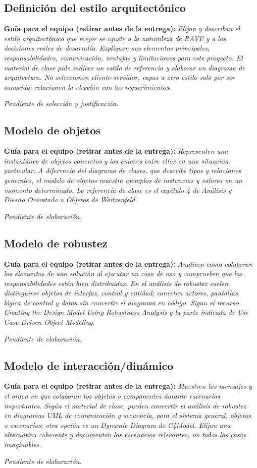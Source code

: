 \documentclass[12pt,letterpaper]{article}
\newcommand{\guia}[1]{\par\smallskip\noindent\textbf{Guía para el equipo (retirar antes de la entrega):} \textit{#1}\par\smallskip}
\begin{document}
\subsection{Definición del estilo arquitectónico}
\guia{Elijan y describan el estilo arquitectónico que mejor se ajuste a la naturaleza de RAVE y a las decisiones reales de desarrollo. Expliquen sus elementos principales, responsabilidades, comunicación, ventajas y limitaciones para este proyecto. El material de clase pide indicar un estilo de referencia y elaborar un diagrama de arquitectura. No seleccionen cliente-servidor, capas u otro estilo solo por ser conocido: relacionen la elección con los requerimientos.}
\textit{Pendiente de selección y justificación.}
\subsection{Modelo de objetos}
\guia{Representen una instantánea de objetos concretos y los enlaces entre ellos en una situación particular. A diferencia del diagrama de clases, que describe tipos y relaciones generales, el modelo de objetos muestra ejemplos de instancias y valores en un momento determinado. La referencia de clase es el capítulo 4 de Análisis y Diseño Orientado a Objetos de Weitzenfeld.}
\textit{Pendiente de elaboración.}
\subsection{Modelo de robustez}
\guia{Analicen cómo colaboran los elementos de una solución al ejecutar un caso de uso y comprueben que las responsabilidades estén bien distribuidas. En el análisis de robustez suelen distinguirse objetos de interfaz, control y entidad; conecten actores, pantallas, lógica de control y datos sin convertir el diagrama en código. Sigan el recurso Creating the Design Model Using Robustness Analysis y la parte indicada de Use Case Driven Object Modeling.}
\textit{Pendiente de elaboración.}
\subsection{Modelo de interacción/dinámico}
\guia{Muestren los mensajes y el orden en que colaboran los objetos o componentes durante escenarios importantes. Según el material de clase, pueden convertir el análisis de robustez en diagramas UML de comunicación y secuencia, para el sistema general, objetos o escenarios; otra opción es un Dynamic Diagram de C4Model. Elijan una alternativa coherente y documenten los escenarios relevantes, no todos los casos imaginables.}
\textit{Pendiente de elaboración.}
\end{document}
